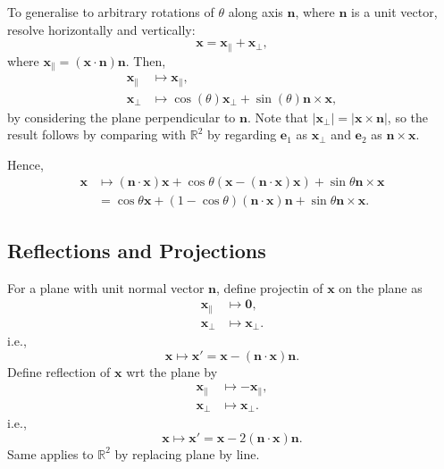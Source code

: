\documentclass[10pt]{article}
\begin{document}
    To generalise to arbitrary rotations of $\theta $ along axis $ \mathbf{n} $, where $ \mathbf{n} $ is a unit vector, resolve horizontally and vertically:
    \[
        \mathbf{x}=\mathbf{x}_{\parallel}+\mathbf{x}_{\perp}
    ,\]
    where $ \mathbf{x}_{\parallel}=(\mathbf{x}\cdot \mathbf{n})\mathbf{n} $.
    Then, 
    \[
        \begin{aligned}
             \mathbf{x}_{\parallel}&\mapsto \mathbf{x}_{\parallel },\\
            \mathbf{x}_{\perp }&\mapsto \cos(\theta)\mathbf{x}_{\perp }+\sin(\theta)\mathbf{n}\times \mathbf{x},
        \end{aligned}
    \]
    by considering the plane perpendicular to $ \mathbf{n} $. Note that $ |\mathbf{x}_{\perp }|=|\mathbf{x}\times \mathbf{n}| $, so the result follows by comparing with $ \mathbb{R}^{2} $ by regarding $ \mathbf{e}_1 $ as $ \mathbf{x}_{\perp } $ and $ \mathbf{e}_2 $ as $ \mathbf{n}\times \mathbf{x} $.

    Hence,
    \[
        \begin{aligned}
            \mathbf{x} &\mapsto (\mathbf{n}\cdot \mathbf{x})\mathbf{x}+\cos \theta (\mathbf{x}-(\mathbf{n}\cdot \mathbf{x})\mathbf{x})+\sin \theta \mathbf{n}\times \mathbf{x}\\
            &= \boxed{\cos \theta \mathbf{x}+(1-\cos \theta)(\mathbf{n}\cdot \mathbf{x})\mathbf{n}+\sin \theta \mathbf{n}\times \mathbf{x}.}
        \end{aligned}
    \]
    \subsection{Reflections and Projections}
    For a plane with unit normal vector $ \mathbf{n} $, define projectin of $ \mathbf{x} $ on the plane as 
    \[
        \begin{aligned}
             \mathbf{x}_{\parallel}& \mapsto \mathbf{0},\\
             \mathbf{x}_{\perp}& \mapsto \mathbf{x}_{\perp}.
        \end{aligned}
    \]
    i.e.,
    \[
        \mathbf{x}\mapsto \mathbf{x}'=\mathbf{x}-(\mathbf{n}\cdot \mathbf{x})\mathbf{n}
    .\]
    Define reflection of $ \mathbf{x} $ wrt the plane by 
    \[
        \begin{aligned}
             \mathbf{x}_{\parallel}& \mapsto -\mathbf{x}_{\parallel},\\
             \mathbf{x}_{\perp}& \mapsto \mathbf{x}_{\perp}.
        \end{aligned}
    \]
    i.e.,
    \[
        \mathbf{x} \mapsto \mathbf{x}'=\mathbf{x}-2(\mathbf{n}\cdot \mathbf{x})\mathbf{n}
    .\]
    Same applies to $ \mathbb{R}^{2} $ by replacing plane by line.
\end{document}
